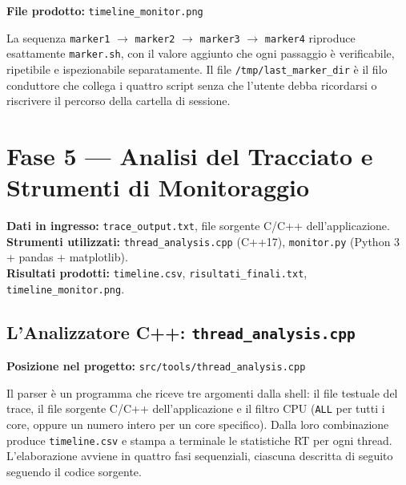 \noindent\textbf{File prodotto:} \texttt{timeline\_monitor.png}

\bigskip

La sequenza \texttt{marker1} $\rightarrow$ \texttt{marker2} $\rightarrow$
\texttt{marker3} $\rightarrow$ \texttt{marker4} riproduce esattamente
\texttt{marker.sh}, con il valore aggiunto che ogni passaggio è verificabile,
ripetibile e ispezionabile separatamente. Il file \texttt{/tmp/last\_marker\_dir}
è il filo conduttore che collega i quattro script senza che l'utente debba
ricordarsi o riscrivere il percorso della cartella di sessione.

\clearpage


\section{Fase 5 --- Analisi del Tracciato e Strumenti di Monitoraggio}
\label{sec:fase5_analisi}
\label{threadanalysis}

\noindent\textbf{Dati in ingresso:} \texttt{trace\_output.txt}, file sorgente C/C++ dell'applicazione.\\
\textbf{Strumenti utilizzati:} \texttt{thread\_analysis.cpp} (C++17), \texttt{monitor.py} (Python 3 + pandas + matplotlib).\\
\textbf{Risultati prodotti:} \texttt{timeline.csv}, \texttt{risultati\_finali.txt}, \texttt{timeline\_monitor.png}.

\subsection{L'Analizzatore C++: \texttt{thread\_analysis.cpp}}

\noindent\textbf{Posizione nel progetto:} \texttt{src/tools/thread\_analysis.cpp}

\bigskip

Il parser è un programma che riceve tre argomenti dalla shell:
il file testuale del trace, il file sorgente C/C++ dell'applicazione e il filtro CPU (\texttt{ALL} per tutti i core, oppure un numero intero per un core
specifico). Dalla loro combinazione produce \texttt{timeline.csv} e stampa a
terminale le statistiche RT per ogni thread. L'elaborazione avviene in quattro
fasi sequenziali, ciascuna descritta di seguito seguendo il codice sorgente.

